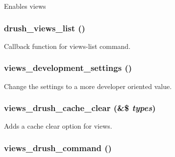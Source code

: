 \label{views_8drush_8inc_afb0fd06776785d9525080d414e981ccb}
Enables views \hypertarget{views_8drush_8inc_a3579085e08bf50ff4595e0bcdde1e4ca}{
\subsubsection[{drush\_\-views\_\-list}]{\setlength{\rightskip}{0pt plus 5cm}drush\_\-views\_\-list ()}}
\label{views_8drush_8inc_a3579085e08bf50ff4595e0bcdde1e4ca}
Callback function for views-\/list command. \hypertarget{views_8drush_8inc_a3b81c7ff5a735d7a023c6a8792a53e4a}{
\subsubsection[{views\_\-development\_\-settings}]{\setlength{\rightskip}{0pt plus 5cm}views\_\-development\_\-settings ()}}
\label{views_8drush_8inc_a3b81c7ff5a735d7a023c6a8792a53e4a}
Change the settings to a more developer oriented value. \hypertarget{views_8drush_8inc_ac10f07a0abb48bc4ae5f54c86f6defbb}{
\subsubsection[{views\_\-drush\_\-cache\_\-clear}]{\setlength{\rightskip}{0pt plus 5cm}views\_\-drush\_\-cache\_\-clear (\&\$ {\em types})}}
\label{views_8drush_8inc_ac10f07a0abb48bc4ae5f54c86f6defbb}
Adds a cache clear option for views. \hypertarget{views_8drush_8inc_a9b31019b890c3e853d82d989996240c2}{
\subsubsection[{views\_\-drush\_\-command}]{\setlength{\rightskip}{0pt plus 5cm}views\_\-drush\_\-command ()}}
\label{views_8drush_8inc_a9b31019b890c3e853d82d989996240c2}
